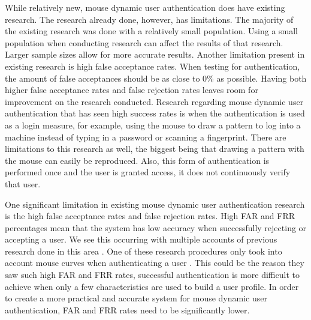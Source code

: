 \documentclass[conference]{IEEEtran}
\begin{document}
While relatively new, mouse dynamic user authentication does have existing research. The research already done, however, has limitations. The majority of the existing research was done with a relatively small population. Using a small population when conducting research can affect the results of that research. Larger sample sizes allow for more accurate results. Another limitation present in existing research is high false acceptance rates. When testing for authentication, the amount of false acceptances should be as close to 0\% as possible. Having both higher false acceptance rates and false rejection rates leaves room for improvement on the research conducted. Research regarding mouse dynamic user authentication that has seen high success rates is when the authentication is used as a login measure, for example, using the mouse to draw a pattern to log into a machine instead of typing in a password or scanning a fingerprint. There are limitations to this research as well, the biggest being that drawing a pattern with the mouse can easily be reproduced. Also, this form of authentication is performed once and the user is granted access, it does not continuously verify that user.

One significant limitation in existing mouse dynamic user authentication research is the high false acceptance rates and false rejection rates. High FAR and FRR percentages mean that the system has low accuracy when successfully rejecting or accepting a user. We see this occurring with multiple accounts of previous research done in this area \cite{Jor, CS, Sch}. One of these research procedures only took into account mouse curves when authenticating a user \cite{Sch}. This could be the reason they saw such high FAR and FRR rates, successful authentication is more difficult to achieve when only a few characteristics are used to build a user profile. In order to create a more practical and accurate system for mouse dynamic user authentication, FAR and FRR rates need to be significantly lower.
\end{document}
